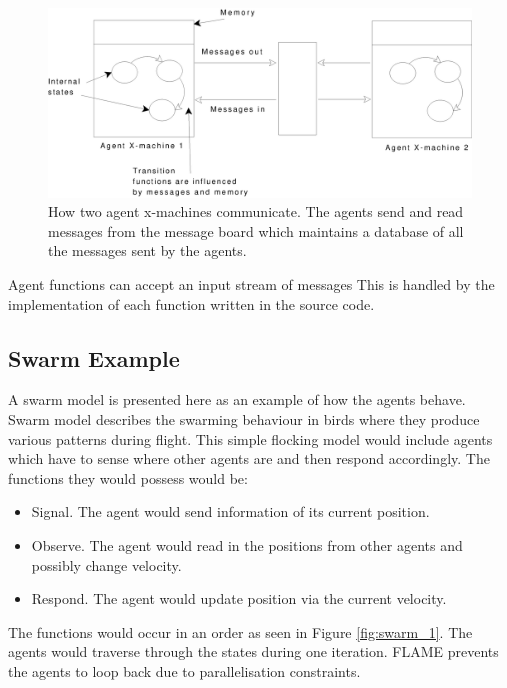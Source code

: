 \begin{figure}[!htb]
\begin{center}
  \includegraphics*[scale=0.45]{commxm.eps}
  \caption{How two agent x-machines communicate. The agents send and read messages from the message board which maintains a database of all the messages sent by the agents.}
  \label{fig:commxm}
  \end{center}
\end{figure}

Agent functions can accept an input stream of messages This is
handled by the implementation of each function written in the source
code.

\subsection{Swarm Example}

A swarm model is presented here as an example of how the agents
behave. Swarm model describes the swarming behaviour in birds where
they produce various patterns during flight. This simple flocking
model would include agents which have to sense where other agents
are and then respond accordingly. The functions they would possess
would be:

\begin{itemize}
\item Signal. The agent would send information of its current
position.
\item Observe. The agent would read in the positions from other agents and possibly change
velocity.
\item Respond. The agent would update position via the current
velocity.
\end{itemize}

The functions would occur in an order as seen in Figure
\ref{fig:swarm_1}. The agents would traverse through the states
during one iteration. FLAME prevents the agents to loop back due to
parallelisation constraints.



